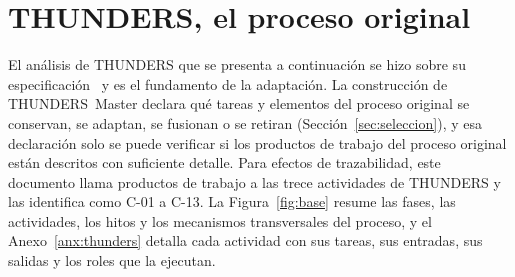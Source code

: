 \documentclass[12pt,letterpaper,oneside]{report}
\begin{document}
\section{THUNDERS, el proceso original}
\label{sec:analisis_thunders}
El análisis de THUNDERS que se presenta a continuación se hizo sobre su
especificación~\cite{agredo2022thesis} y es el fundamento de la adaptación. 
La construcción de THUNDERS~Master declara qué tareas y elementos
del proceso original se conservan, se adaptan, se fusionan o se retiran
(Sección~\ref{sec:seleccion}), y esa declaración solo se puede verificar si los
productos de trabajo del proceso original están descritos con suficiente detalle. Para
efectos de trazabilidad, este documento llama productos de trabajo a las trece
actividades de THUNDERS y las identifica como C-01 a C-13. La Figura~\ref{fig:base} resume las fases, las
actividades, los hitos y los mecanismos transversales del proceso, y el
Anexo~\ref{anx:thunders} detalla cada actividad con sus tareas, sus entradas,
sus salidas y los roles que la ejecutan.
\end{document}
